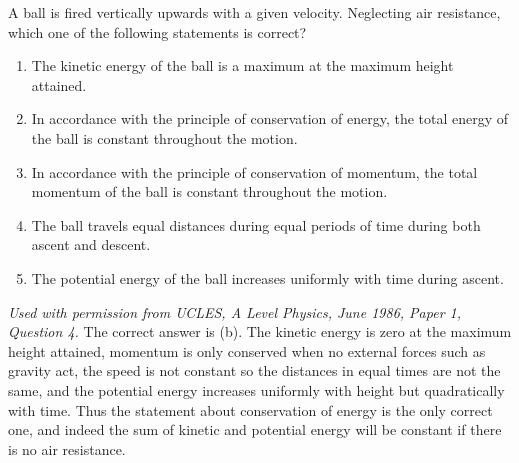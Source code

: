 
\begin{problem}[A1986PIQ4l] 
{A ball is fired vertically upwards with a given velocity. Neglecting air resistance, which one of the following statements is correct?
\begin{enumerate}
	\item The kinetic energy of the ball is a maximum at the maximum height attained.
	\item In accordance with the principle of conservation of energy, the total energy of the ball is constant throughout the motion. \answer
	\item In accordance with the principle of conservation of momentum, the total momentum of the ball is constant throughout the motion.
	\item The ball travels equal distances during equal periods of time during both ascent and descent. 
	\item The potential energy of the ball increases uniformly with time during ascent.
\end{enumerate}
}
{\textit{Used with permission from UCLES, A Level Physics, June 1986, Paper 1, Question 4.}}
{The correct answer is (b). The kinetic energy is zero at the maximum height attained, momentum is only conserved when no external forces such as gravity act, the speed is not constant so the distances in equal times are not the same, and the potential energy increases uniformly with height but quadratically with time. Thus the statement about conservation of energy is the only correct one, and indeed the sum of kinetic and potential energy will be constant if there is no air resistance.}
\end{problem}